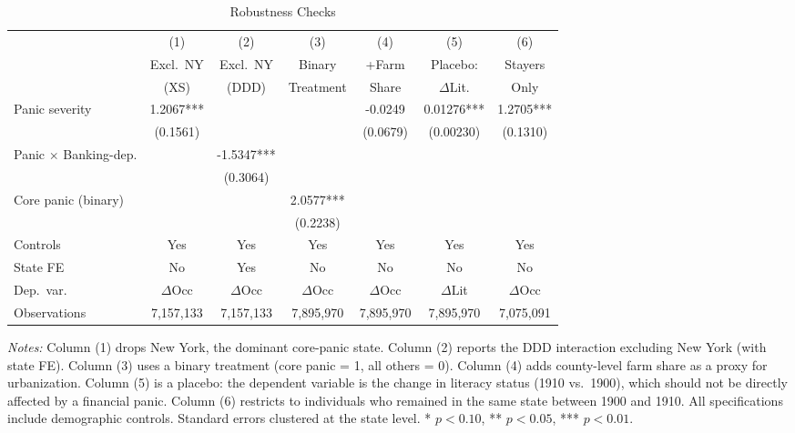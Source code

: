 \begin{table}[H]
\centering
\caption{Robustness Checks}
\begin{threeparttable}
\footnotesize
\begin{tabular}{lcccccc}
\toprule
 & (1) & (2) & (3) & (4) & (5) & (6) \\
 & Excl.\ NY & Excl.\ NY & Binary & +Farm & Placebo: & Stayers \\
 & (XS) & (DDD) & Treatment & Share & $\Delta$Lit. & Only \\
\midrule
Panic severity & 1.2067*** & & & -0.0249 & 0.01276*** & 1.2705*** \\
 & (0.1561) & & & (0.0679) & (0.00230) & (0.1310) \\
Panic $\times$ Banking-dep. & & -1.5347*** & & & & \\
 & & (0.3064) & & & & \\
Core panic (binary) & & & 2.0577*** & & & \\
 & & & (0.2238) & & & \\
\midrule
Controls & Yes & Yes & Yes & Yes & Yes & Yes \\
State FE & No & Yes & No & No & No & No \\
Dep.\ var. & $\Delta$Occ & $\Delta$Occ & $\Delta$Occ & $\Delta$Occ & $\Delta$Lit & $\Delta$Occ \\
Observations & 7,157,133 & 7,157,133 & 7,895,970 & 7,895,970 & 7,895,970 & 7,075,091 \\
\bottomrule
\end{tabular}
\begin{tablenotes}[flushleft]
\small
\item \textit{Notes:} Column (1) drops New York, the dominant core-panic state. Column (2) reports the DDD interaction excluding New York (with state FE). Column (3) uses a binary treatment (core panic = 1, all others = 0). Column (4) adds county-level farm share as a proxy for urbanization. Column (5) is a placebo: the dependent variable is the change in literacy status (1910 vs.\ 1900), which should not be directly affected by a financial panic. Column (6) restricts to individuals who remained in the same state between 1900 and 1910. All specifications include demographic controls. Standard errors clustered at the state level. * $p<0.10$, ** $p<0.05$, *** $p<0.01$.
\end{tablenotes}
\end{threeparttable}
\label{tab:robustness}
\end{table}


